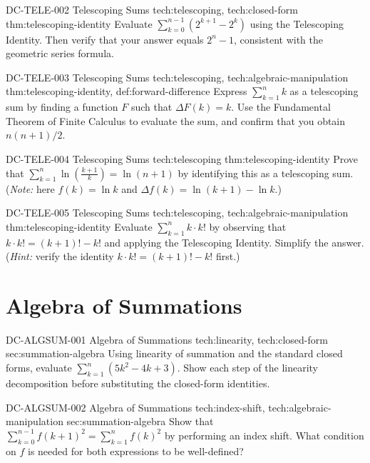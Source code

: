 \exstubgenfull
  {DC-TELE-002}
  {Telescoping Sums}
  {tech:telescoping, tech:closed-form}
  {thm:telescoping-identity}
  {Evaluate \(\displaystyle\sum_{k=0}^{n-1}(2^{k+1} - 2^k)\) using the
  Telescoping Identity. Then verify that your answer equals \(2^n - 1\),
  consistent with the geometric series formula.}

\exstubgenfull
  {DC-TELE-003}
  {Telescoping Sums}
  {tech:telescoping, tech:algebraic-manipulation}
  {thm:telescoping-identity, def:forward-difference}
  {Express \(\displaystyle\sum_{k=1}^{n}k\) as a telescoping sum by
  finding a function \(F\) such that \(\Delta F(k) = k\). Use the
  Fundamental Theorem of Finite Calculus to evaluate the sum, and
  confirm that you obtain \(n(n+1)/2\).}

\exstubgenfull
  {DC-TELE-004}
  {Telescoping Sums}
  {tech:telescoping}
  {thm:telescoping-identity}
  {Prove that
  \(\displaystyle\sum_{k=1}^{n}\ln\!\left(\frac{k+1}{k}\right) = \ln(n+1)\)
  by identifying this as a telescoping sum. (\emph{Note:} here \(f(k) = \ln k\)
  and \(\Delta f(k) = \ln(k+1) - \ln k\).)}

\exstubgenfull
  {DC-TELE-005}
  {Telescoping Sums}
  {tech:telescoping, tech:algebraic-manipulation}
  {thm:telescoping-identity}
  {Evaluate \(\displaystyle\sum_{k=1}^{n}k\cdot k!\) by observing that
  \(k\cdot k! = (k+1)! - k!\) and applying the Telescoping Identity.
  Simplify the answer. (\emph{Hint:} verify the identity \(k\cdot k! = (k+1)! - k!\)
  first.)}

\section*{Algebra of Summations}

\exstubgenfull
  {DC-ALGSUM-001}
  {Algebra of Summations}
  {tech:linearity, tech:closed-form}
  {sec:summation-algebra}
  {Using linearity of summation and the standard closed forms, evaluate
  \(\displaystyle\sum_{k=1}^{n}(5k^2 - 4k + 3)\).
  Show each step of the linearity decomposition before substituting
  the closed-form identities.}

\exstubgenfull
  {DC-ALGSUM-002}
  {Algebra of Summations}
  {tech:index-shift, tech:algebraic-manipulation}
  {sec:summation-algebra}
  {Show that \(\displaystyle\sum_{k=0}^{n-1} f(k+1)^2 = \sum_{k=1}^{n} f(k)^2\)
  by performing an index shift. What condition on \(f\) is needed
  for both expressions to be well-defined?}

